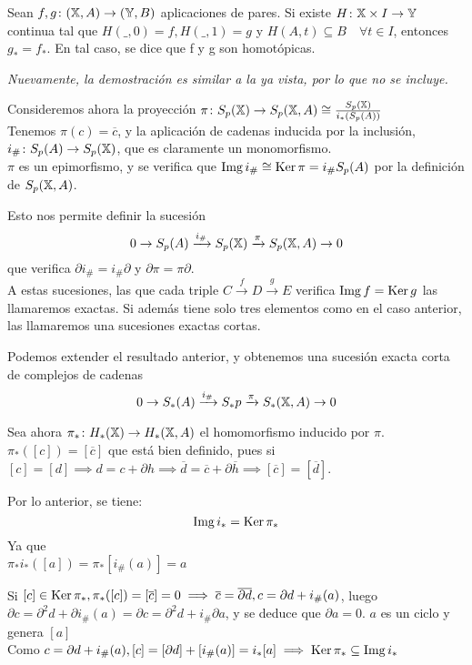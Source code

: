 \begin{proposition}
  Sean $f, g \colon ({\mathbb X}, A) \to ({\mathbb Y}, B)$ aplicaciones de pares. Si existe $H \colon {\mathbb X} \times I \to {\mathbb Y}$ continua tal que
  $H(\_, 0) = f, H(\_, 1) = g$ y $H(A, t) \subseteq B \quad \forall t \in I$, entonces $g_* = f_*$. En tal caso, se dice que
  f y g son homotópicas.
\end{proposition}

\textit{Nuevamente, la demostración es similar a la ya vista, por lo que no se incluye.}

Consideremos ahora la proyección $\pi \colon S_{p}({\mathbb X}) \to S_p({\mathbb X}, A) \cong \frac{S_{p}({\mathbb X})}{i_*(S_p(A))}$ \\
Tenemos $\pi(c) = \overline{c}$, y la aplicación de cadenas inducida por la inclusión, $i_\# \colon S_p(A) \to S_{p}({\mathbb X})$,
que es claramente un monomorfismo. \\
$\pi$ es un epimorfismo, y se verifica que $\operatorname{Img} i_\# \cong \operatorname{Ker} \pi = i_\# S_p(A)$ por la definición de $S_p({\mathbb X}, A)$.

Esto nos permite definir la sucesión \[0 \to S_p(A) \xrightarrow{i_\#} S_{p}({\mathbb X}) \xrightarrow{\pi} S_p({\mathbb X}, A) \to 0 \] que verifica
$\partial i_\# = i_\# \partial$ y $\partial \pi = \pi \partial$. \\
A estas sucesiones, las que cada triple $C \xrightarrow{f} D \xrightarrow{g} E$ verifica $\operatorname{Img} f = \operatorname{Ker} g$ las llamaremos exactas.
Si además tiene solo tres elementos como en el caso anterior, las llamaremos una sucesiones exactas cortas.

Podemos extender el resultado anterior, y obtenemos una sucesión exacta corta de complejos de cadenas
\[0 \to S_*(A) \xrightarrow{i_\#} S_*{p} \xrightarrow{\pi} S_*({\mathbb X}, A) \to 0 \]

Sea ahora $\pi_* \colon H_*({\mathbb X}) \to H_*({\mathbb X}, A)$ el homomorfismo inducido por $\pi$. \\
$\pi_*([c]) = [\overline{c}]$ que está bien definido, pues si $[c] = [d] \implies d = c + \partial h \implies \overline{d} = \overline{c} + \partial \overline{h}
\implies [\overline{c}] = [\overline{d}]$.

Por lo anterior, se tiene:
  \[\operatorname{Img} i_* = \operatorname{Ker} \pi_*\]
Ya que \\
  $\pi_* i_* ([a]) = \pi_*[i_\#(a)] = a $


Si $[c] \in \operatorname{Ker} \pi_*, \pi_*([c]) = [\overline{c}] = 0 \implies \overline{c} = \overline{\partial d}, c = \partial d + i_\#(a)$,
luego $\partial c = \partial^2 d + \partial i_\#(a) = \partial c = \partial^2 d + i_\# \partial a$, y se deduce que $\partial a = 0$.
$a$ es un ciclo y genera $[a]$ \\
Como $c = \partial d + i_\#(a), [c] = [\partial d] + [i_\#(a)] = i_*[a] \implies \operatorname{Ker} \pi_* \subseteq \operatorname{Img} i_*$

